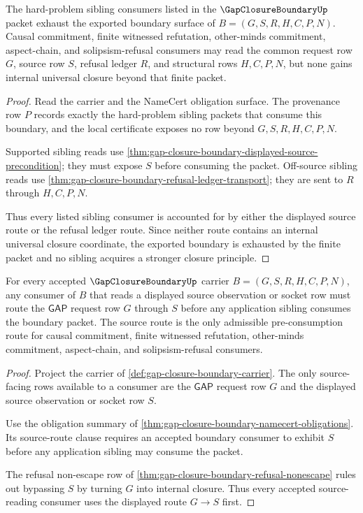 \begin{theorem}
\label{thm:gap-closure-boundary-sibling-consumer-exhaustion}
The hard-problem sibling consumers listed in the $\GapClosureBoundaryUp$ packet exhaust the exported boundary surface of $B=(G,S,R,H,C,P,N)$. Causal commitment, finite witnessed refutation, other-minds commitment, aspect-chain, and solipsism-refusal consumers may read the common request row $G$, source row $S$, refusal ledger $R$, and structural rows $H,C,P,N$, but none gains internal universal closure beyond that finite packet.
\end{theorem}
\begin{proof}
Read the carrier and the NameCert obligation surface. The provenance row $P$ records exactly the hard-problem sibling packets that consume this boundary, and the local certificate exposes no row beyond $G,S,R,H,C,P,N$.

Supported sibling reads use \autoref{thm:gap-closure-boundary-displayed-source-precondition}; they must expose $S$ before consuming the packet. Off-source sibling reads use \autoref{thm:gap-closure-boundary-refusal-ledger-transport}; they are sent to $R$ through $H,C,P,N$.

Thus every listed sibling consumer is accounted for by either the displayed source route or the refusal ledger route. Since neither route contains an internal universal closure coordinate, the exported boundary is exhausted by the finite packet and no sibling acquires a stronger closure principle.
\end{proof}

\begin{theorem}
\label{thm:gap-closure-boundary-source-route-exactness}
For every accepted $\GapClosureBoundaryUp$ carrier $B=(G,S,R,H,C,P,N)$, any
consumer of $B$ that reads a displayed source observation or socket row must
route the $\mathsf{GAP}$ request row $G$ through $S$ before any application
sibling consumes the boundary packet. The source route is the only admissible
pre-consumption route for causal commitment, finite witnessed refutation,
other-minds commitment, aspect-chain, and solipsism-refusal consumers.
\end{theorem}
\begin{proof}
Project the carrier of \autoref{def:gap-closure-boundary-carrier}. The only
source-facing rows available to a consumer are the $\mathsf{GAP}$ request row
$G$ and the displayed source observation or socket row $S$.

Use the obligation summary of
\autoref{thm:gap-closure-boundary-namecert-obligations}. Its source-route
clause requires an accepted boundary consumer to exhibit $S$ before any
application sibling may consume the packet.

The refusal non-escape row of
\autoref{thm:gap-closure-boundary-refusal-nonescape} rules out bypassing $S$ by
turning $G$ into internal closure. Thus every accepted source-reading consumer
uses the displayed route $G \longrightarrow S$ first.
\end{proof}

